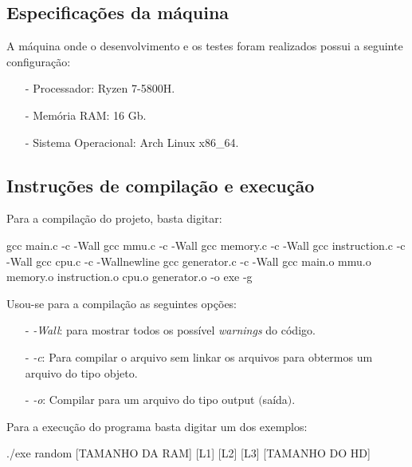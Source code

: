 \documentclass{article}
\begin{document}
\subsection{Especificações da máquina}
A máquina onde o desenvolvimento e os testes foram realizados possui a seguinte configuração:

\begin{itemize}
    \item[-] Processador: Ryzen 7-5800H.
    \item[-] Memória RAM: 16 Gb.
    \item[-] Sistema Operacional: Arch Linux x86\_64.
\end{itemize}


\subsection{Instruções de compilação e execução}

Para a compilação do projeto, basta digitar:

\begin{tcolorbox}[title=Compilando o projeto,width=\linewidth]
    gcc main.c -c -Wall \newline
    gcc mmu.c -c -Wall \newline
    gcc memory.c -c -Wall\newline
    gcc instruction.c -c -Wall\newline
    gcc cpu.c -c -Wallnewline
    gcc generator.c -c -Wall\newline
    gcc main.o mmu.o memory.o instruction.o cpu.o generator.o -o exe -g
\end{tcolorbox}

Usou-se para a compilação as seguintes opções:

\begin{itemize}
    \item [-] \emph{-Wall}: para mostrar todos os possível \emph{warnings} do código.
    \item [-] \emph{-c}: Para compilar o arquivo sem linkar os arquivos para obtermos um arquivo do tipo objeto.
    \item [-] \emph{-o}: Compilar para um arquivo do tipo output $($saída$)$.
\end{itemize}

Para a execução do programa basta digitar um dos exemplos:
\begin{tcolorbox}[title=,width=\linewidth]
    ./exe random [TAMANHO DA RAM] [L1] [L2] [L3] [TAMANHO DO HD]\newline


\end{tcolorbox}
\end{document}
